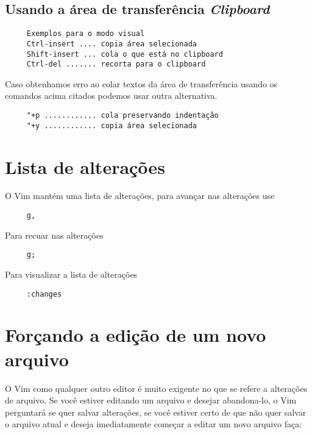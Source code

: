 \subsection{Usando a área de transferência {\em Clipboard}}

\begin{verbatim}
     Exemplos para o modo visual
     Ctrl-insert .... copia área selecionada 
     Shift-insert ... cola o que está no clipboard
     Ctrl-del ....... recorta para o clipboard
\end{verbatim}

Caso obtenhamos erro ao colar textos da área de transferência
usando os comandos acima citados podemos usar outra alternativa.

\begin{verbatim}
     "+p ............ cola preservando indentação
     "+y ............ copia área selecionada
\end{verbatim}

\section{Lista de alterações}
O Vim mantém uma lista de alterações, para avançar nas alterações use

\begin{verbatim}
     g,
\end{verbatim}

Para recuar nas alterações

\begin{verbatim}
     g;
\end{verbatim}

Para visualizar a lista de alterações

\begin{verbatim}
     :changes
\end{verbatim}

\section{Forçando a edição de um novo arquivo}\label{sec:Forçando a edição de um novo arquivo}

O Vim como qualquer outro editor é muito exigente no que se refere a alterações
de arquivo.  Se você estiver editando um arquivo e desejar abandona-lo, o Vim
perguntará se quer salvar alterações, se você estiver certo de que não quer
salvar o arquivo atual e deseja imediatamente começar a editar um novo arquivo
faça:

